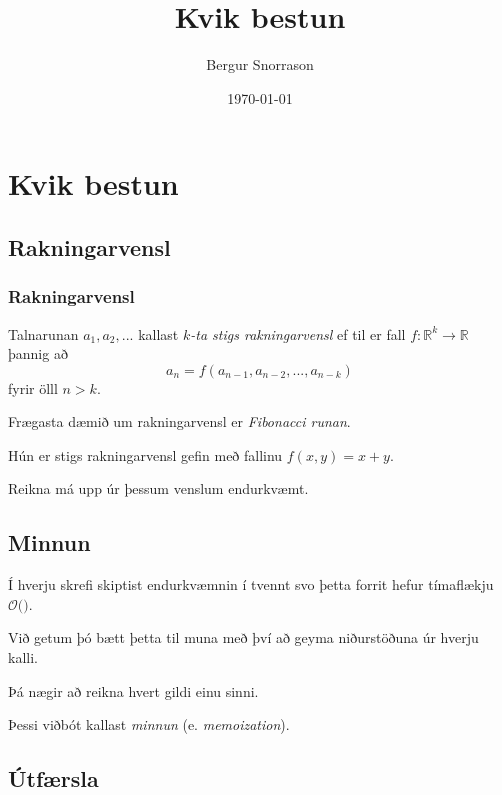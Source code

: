 \title{Kvik bestun}
\author{Bergur Snorrason}
\date{\today}



\frame{\titlepage}

\section{Kvik bestun}
\subsection{Rakningarvensl}
{
    \frametitle{Rakningarvensl}
    {
        \item<1-> Talnarunan $a_1, a_2, ...$ kallast \emph{$k$-ta stigs rakningarvensl} ef til er fall
            $f \colon \mathbb{R}^k \rightarrow \mathbb{R}$ þannig að
            \[
            a_n = f(a_{n - 1}, a_{n - 2}, ..., a_{n - k})
                \]
                fyrir ölll $n > k$.
        \item<2-> Frægasta dæmið um rakningarvensl er \emph{Fibonacci runan}.
        \item<3-> Hún er  stigs rakningarvensl gefin með fallinu $f(x, y) = x + y$.
        \item<5-> Reikna má upp úr þessum venslum endurkvæmt.
        \item<6->[] 
    }
}

\subsection{Minnun}
{
    {
        \item<1-> Í hverju skrefi skiptist endurkvæmnin í tvennt svo þetta forrit hefur tímaflækju $\mathcal{O}($$)$.
        \item<3-> Við getum þó bætt þetta til muna með því að geyma niðurstöðuna úr hverju kalli.
        \item<4-> Þá nægir að reikna hvert gildi einu sinni.
        \item<5-> Þessi viðbót kallast \emph{minnun} (e. \emph{memoization}).
    }
}

\subsection{Útfærsla}
{
}

